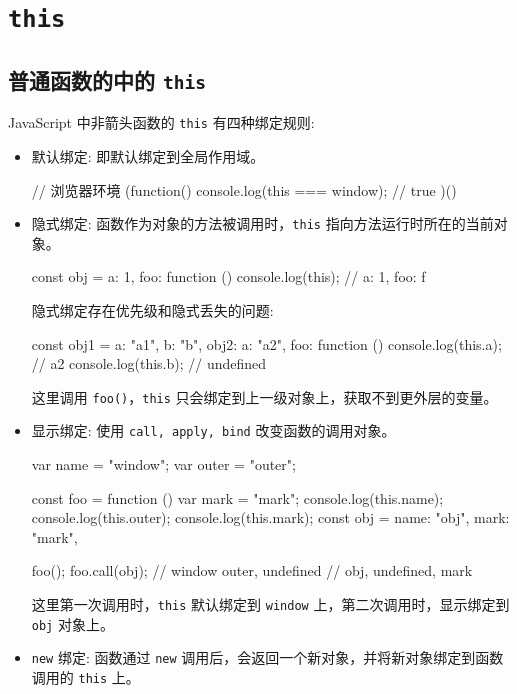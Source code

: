 \section{\texttt{this}}

\subsection{普通函数的中的 \texttt{this}}

JavaScript 中非箭头函数的 \texttt{this} 有四种绑定规则:
\begin{itemize}
  \item 默认绑定: 即默认绑定到全局作用域。
\begin{JavaScript}
// 浏览器环境
(function() {
  console.log(this === window); // true
})()
\end{JavaScript}
  \item 隐式绑定: 函数作为对象的方法被调用时，\texttt{this} 指向方法运行时所在的当前对象。
\begin{JavaScript}
const obj = {
  a: 1,
  foo: function () {
    console.log(this);  // {a: 1, foo: ƒ}
  }
}
\end{JavaScript}
隐式绑定存在优先级和隐式丢失的问题:
\begin{JavaScript}
const obj1 = {
  a: "a1",
  b: "b",
  obj2: {
    a: "a2",
    foo: function () {
      console.log(this.a);  // a2
      console.log(this.b);  // undefined
    }
  }
}
\end{JavaScript}
这里调用 \texttt{foo()}，\texttt{this} 只会绑定到上一级对象上，获取不到更外层的变量。

  \item 显示绑定: 使用 \texttt{call, apply, bind} 改变函数的调用对象。
\begin{JavaScript}
  var name = "window";
  var outer = "outer";
  
  const foo = function () {
    var mark = "mark";
    console.log(this.name);
    console.log(this.outer);
    console.log(this.mark);
  }
  const obj = {
    name: "obj",
    mark: "mark",
  }
  
  foo();
  foo.call(obj);
// window outer, undefined
// obj, undefined, mark
\end{JavaScript}
这里第一次调用时，\texttt{this} 默认绑定到 \texttt{window} 上，第二次调用时，显示绑定到 \texttt{obj} 对象上。
\item \texttt{new} 绑定: 函数通过 \texttt{new} 调用后，会返回一个新对象，并将新对象绑定到函数调用的 \texttt{this} 上。
\end{itemize}

